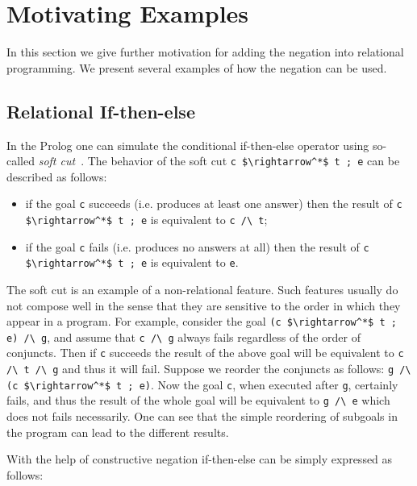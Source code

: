 \section{Motivating Examples}

\label{sec:motivation}

In this section we give further motivation 
for adding the negation into relational programming.
We present several examples of how the negation can be used.

\subsection{Relational If-then-else}

\label{sec:ifte}

In the Prolog one can simulate the conditional if-then-else
operator using so-called \emph{soft cut}~\cite{naish1995pruning}.
The behavior of the soft cut \lstinline{c $\rightarrow^*$ t ; e}
can be described as follows:

\begin{itemize}
  \item if the goal \lstinline{c} succeeds 
        (i.e. produces at least one answer) then
        the result of \lstinline{c $\rightarrow^*$ t ; e}
        is equivalent to \lstinline{c /\ t};
  \item if the goal \lstinline{c} fails 
        (i.e. produces no answers at all) then
        the result of \lstinline{c $\rightarrow^*$ t ; e}
        is equivalent to \lstinline{e}.
\end{itemize}

The soft cut is an example of a non-relational feature.
Such features usually do not compose well
in the sense that they are sensitive to the 
order in which they appear in a program.
For example, consider the goal 
\lstinline{(c $\rightarrow^*$ t ; e) /\ g},
and assume that \lstinline{c /\ g} always fails
regardless of the order of conjuncts.
Then if \lstinline{c} succeeds the result 
of the above goal will be equivalent to 
\lstinline{c /\ t /\ g} and thus it will fail.
Suppose we reorder the conjuncts as follows:
\lstinline{g /\ (c $\rightarrow^*$ t ; e)}.
Now the goal \lstinline{c}, when executed after \lstinline{g}, 
certainly fails, and thus the result 
of the whole goal will be equivalent to
\lstinline{g /\ e} which does not fails necessarily.
One can see that the simple reordering 
of subgoals in the program can lead to the different results.

With the help of constructive negation
if-then-else can be simply expressed as follows:

